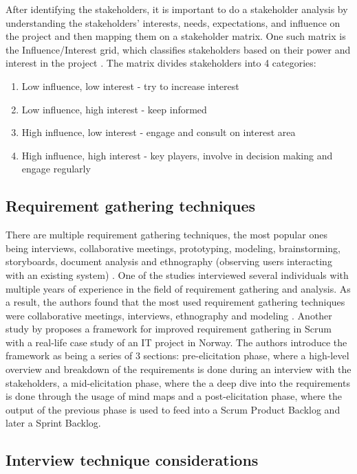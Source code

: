 After identifying the stakeholders, it is important to do a stakeholder analysis by understanding the stakeholders' interests, needs, expectations, and influence on the project and then mapping them on a stakeholder matrix. One such matrix is the Influence/Interest grid, which classifies stakeholders based on their power and interest in the project \parencite{stakeholders}. The matrix divides stakeholders into 4 categories:
\begin{enumerate}
    \item Low influence, low interest - try to increase interest
    \item Low influence, high interest - keep informed 
    \item High influence, low interest - engage and consult on interest area
    \item High influence, high interest - key players, involve in decision making and engage regularly
\end{enumerate}

\subsection{Requirement gathering techniques}

There are multiple requirement gathering techniques, the most popular ones being interviews, collaborative meetings, prototyping, modeling, brainstorming, storyboards, document analysis and ethnography (observing users interacting with an existing system) \parencite{reqanalysis1,reqanalysis2, reqanalysis3, reqanalysis4}. One of the studies interviewed  several individuals with multiple years of experience in the field of requirement gathering and analysis. As a result, the authors found that the most used requirement gathering techniques were collaborative meetings, interviews, ethnography and modeling \parencite{reqanalysis1}. Another study by \textcite{reqanalysis6} proposes a framework for improved requirement gathering in Scrum with a real-life case study of an IT project in Norway. The authors introduce the framework as being a series of 3 sections: pre-elicitation phase, where a high-level overview and breakdown of the requirements is done during an interview with the stakeholders, a mid-elicitation phase, where the a deep dive into the requirements is done through the usage of mind maps and a post-elicitation phase, where the output of the previous phase is used to feed into a Scrum Product Backlog and later a Sprint Backlog.

\subsection{Interview technique considerations}

